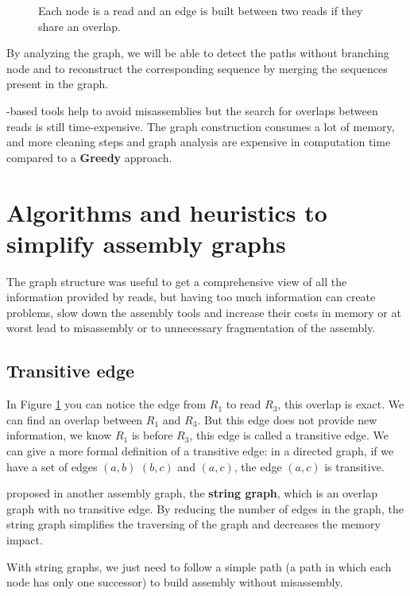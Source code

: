 \documentclass[main]{subfiles}
\begin{document}
\begin{figure}[ht]
    \centering 
    
    \caption{Each node is a read and an edge is built between two reads if they share an overlap.}
    \label{intro:fig:olc:graph}
\end{figure}

By analyzing the graph, we will be able to detect the paths without branching node and to reconstruct the corresponding sequence by merging the sequences present in the graph.

\OLC-based tools help to avoid misassemblies but the search for overlaps between reads is still time-expensive. The graph construction consumes a lot of memory, and more cleaning steps and graph analysis are expensive in computation time compared to a \textbf{Greedy} approach. 

\section{Algorithms and heuristics to simplify assembly graphs}

The graph structure was useful to get a comprehensive view of all the information provided by reads, but having too much information can create problems, slow down the assembly tools and increase their costs in memory or at worst lead to misassembly or to unnecessary fragmentation of the assembly.

\subsection{Transitive edge}  \label{intro:subsubsec:transitive_edge}

In Figure \ref{intro:fig:olc:graph} you can notice the edge from $R_1$ to read $R_3$, this overlap is exact. We can find an overlap between $R_1$ and $R_3$. But this edge does not provide new information, we know $R_1$ is before $R_3$, this edge is called a transitive edge. We can give a more formal definition of a transitive edge: in a directed graph, if we have a set of edges $(a, b)$ $(b, c)$ and $(a, c)$, the edge $(a, c)$ is transitive.

\citeauthor{string_graph} proposed in \cite{string_graph} another assembly graph, the \textbf{string graph}, which is an overlap graph with no transitive edge. By reducing the number of edges in the graph, the string graph simplifies the traversing of the graph and decreases the memory impact.

With string graphs, we just need to follow a simple path (a path in which each node has only one successor) to build assembly without misassembly.
\end{document}
